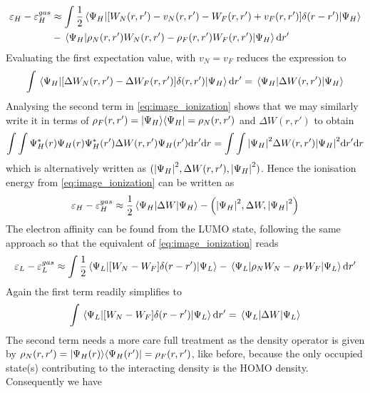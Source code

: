 \begin{solution}
\begin{equation}
    \begin{split}
        \varepsilon_H - \varepsilon_H^{gas} &\approx \int\dfrac{1}{2}\mel{\Psi_H}{[W_N(r,r')-v_N(r,r') - W_{F}(r,r') + v_{F}(r,r')]\delta(r-r')}{\Psi_H} \\
        &-\mel{\Psi_H}{\rho_{N}(r,r')W_{N}(r,r') -\rho_{F}(r,r')W_{F}(r,r')}{\Psi_H}\mathrm{d}r'
    \end{split}
\end{equation}
Evaluating the first expectation value, with $v_N = v_F$ reduces the expression to
\begin{equation}
    \int\mel{\Psi_H}{[\Delta W_{N}(r,r') - \Delta W_{F}(r,r')]\delta(r,r')}{\Psi_H}\mathrm{d}r' = \mel{\Psi_H}{\Delta W(r,r')}{\Psi_H}
\end{equation}
Analysing the second term in \eqref{eq:image_ionization} shows that we may similarly write it in terms of $\rho_{F}(r,r') = |\Psi_H\rangle\langle \Psi_H | = \rho_{N}(r,r')$ and $\Delta W(r,r')$ to obtain
\begin{equation}
    \int \int \Psi_H^{*}(r)\Psi_H(r)\Psi_H^{*}(r')\Delta W(r,r') \Psi_H(r') \mathrm{d}r'\mathrm{d}r = \int \int \abs{\Psi_H}^2\Delta W(r,r') \abs{\Psi_H}^2\mathrm{d}r'\mathrm{d}r
\end{equation}
which is alternatively written as $(\abs{\Psi_H}^2,\Delta W(r,r'),\abs{\Psi_H}^2)$. Hence the ionisation energy from \eqref{eq:image_ionization} can be written as
\begin{equation}
    \varepsilon_H - \varepsilon_H^{gas} \approx \dfrac{1}{2}\mel{\Psi_H}{\Delta W}{\Psi_H} - \left(\abs{\Psi_H}^2,\Delta W,\abs{\Psi_H}^2\right)
\end{equation}
The electron affinity can be found from the LUMO state, following the same approach so that the equivalent of \eqref{eq:image_ionization} reads
\begin{equation}
    \varepsilon_L - \varepsilon_L^{gas} \approx \int \dfrac{1}{2}\mel{\Psi_L}{[W_{N}-W_{F}]\delta(r-r')}{\Psi_L} - \mel{\Psi_L}{\rho_N W_{N} - \rho_F W_{F}}{\Psi_L}\mathrm{d}r'
\end{equation}
Again the first term readily simplifies to 
\begin{equation}
    \int\mel{\Psi_L}{[W_{N}-W_{F}]\delta(r-r')}{\Psi_L} \mathrm{d}r'= \mel{\Psi_L}{\Delta W}{\Psi_L}
\end{equation}
The second term needs a more care full treatment as the density operator is given by $\rho_N(r,r') = |\Psi_H(r)\rangle\langle \Psi_H(r') | = \rho_F(r,r')$, like before, because the only occupied state(s) contributing to the interacting density is the HOMO density. Consequently we have

\end{solution}
